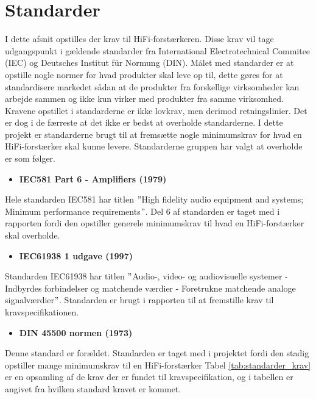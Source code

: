 \section{Standarder}
I dette afsnit opstilles der krav til HiFi-forstærkeren. Disse krav vil tage udgangspunkt i gældende standarder fra International Electrotechnical Commitee (IEC) og Deutsches Institut f\"{u}r Normung (DIN). Målet med standarder er at opstille nogle normer for hvad produkter skal leve op til, dette gøres for at standardisere markedet sådan at de produkter fra forskellige virksomheder kan arbejde sammen og ikke kun virker med produkter fra samme virksomhed. Kravene opstillet i standarderne er ikke lovkrav, men derimod retningslinier. Det er dog i de færreste at det ikke er bedst at overholde standarderne.
\newline
I dette projekt er standarderne brugt til at fremsætte nogle minimumskrav for hvad en HiFi-forstærker skal kunne levere. Standarderne gruppen har valgt at overholde er som følger.


\begin{itemize}              
\item \textbf{IEC581 Part 6 - Amplifiers (1979)}
\end{itemize} 
Hele standarden IEC581 har titlen $"$High fidelity audio equipment and systems; Minimum performance requirements$"$. Del 6 af standarden er taget med i rapporten fordi den opstiller generele minimumskrav til hvad en HiFi-forstærker skal overholde.
\begin{itemize}              
\item \textbf{IEC61938 1 udgave (1997)}                 
\end{itemize} 
Standarden IEC61938 har titlen $"$Audio-, video- og audiovisuelle systemer - Indbyrdes forbindelser og matchende værdier - Foretrukne matchende analoge signalværdier$"$. Standarden er brugt i rapporten til at fremstille krav til kravspecifikationen.
\begin{itemize}                   
\item \textbf{DIN 45500 normen (1973)}   
\end{itemize} 
Denne standard er forældet. Standarden er taget med i projektet fordi den stadig opstiller mange minimumskrav til en HiFi-forstærker
\newline
\newline
Tabel \ref{tab:standarder_krav} er en opsamling af de krav der er fundet til kravspecifikation, og i tabellen er angivet fra hvilken standard kravet er kommet.

